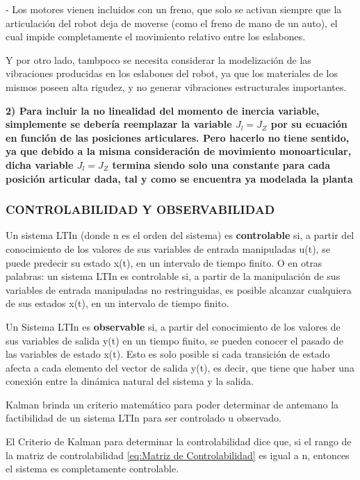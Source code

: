 \documentclass{article}
\begin{document}
\begin{sloppypar}
- Los motores vienen incluidos con un freno, que solo se activan siempre que la articulación del robot deja de moverse (como el freno de mano de un auto), el cual impide completamente el movimiento relativo entre los eslabones.  %

Y por otro lado, tambpoco se necesita considerar la modelización de las vibraciones producidas en los eslabones del robot, ya que los materiales de los mismos poseen alta rigudez, y no generar vibraciones estructurales importantes.

\textbf{2) Para incluir la no linealidad del momento de inercia variable, simplemente se debería reemplazar la variable $J_l=J_Z$ por su ecuación en función de las posiciones articulares. Pero hacerlo no tiene sentido, ya que debido a la misma consideración de movimiento monoarticular, dicha variable $J_l=J_Z$ termina siendo solo una constante para cada posición articular dada, tal y como se encuentra ya modelada la planta}




\subsubsection{CONTROLABILIDAD Y OBSERVABILIDAD}
\label{sec:CONTROLABILIDAD Y OBSERVABILIDAD}

Un sistema LTIn (donde n es el orden del sistema) es \textbf{controlable} si, a partir del conocimiento de los valores de sus variables de entrada manipuladas u(t), se puede predecir su estado x(t), en un intervalo de tiempo finito. O en otras palabras: un sistema LTIn es controlable si, a partir de la manipulación de sus variables de entrada manipuladas no restringuidas, es posible alcanzar cualquiera de sus estados x(t), en un intervalo de tiempo finito.

Un Sistema LTIn es \textbf{observable} si, a partir del conocimiento de los valores de sus variables de salida y(t) en un tiempo finito, se pueden conocer el pasado de las variables de estado x(t). Esto es solo posible si cada transición de estado afecta a cada elemento del vector de salida y(t), es decir, que tiene que haber una conexión entre la dinámica natural del sistema y la salida.

Kalman brinda un criterio matemático para poder determinar de antemano la factibilidad de un sistema LTIn para ser controlado u observado.

El Criterio de Kalman para determinar la controlabilidad dice que, si el rango de la matriz de controlabilidad \ref{eq:Matriz de Controlabilidad} es igual a n, entonces el sistema es completamente controlable.


\end{sloppypar}
\end{document}
